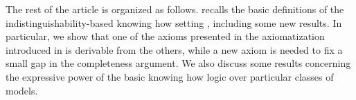 






The rest of the article is organized as follows.  recalls the basic definitions of the indistinguishability-based knowing how setting \cite{AFSVQ21,AFSVQ23report}, including some new results. In particular, we show that one of the axioms presented in the axiomatization introduced in \cite{AFSVQ21,AFSVQ23report} is derivable from the others, while a new axiom is needed to fix a small gap in the completeness argument. We also discuss some results concerning the expressive power of the basic knowing how logic over particular classes of models. 

